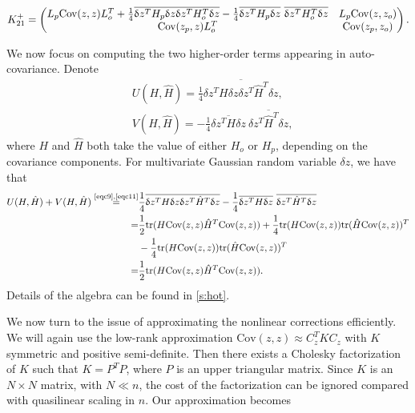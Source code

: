 \documentclass[article,ij4uq]{ij4uq}              %
\begin{document}
\begin{align}
    K_{21}^{+}=\begin{pmatrix}L_{p}{\rm{Cov}}(z,z)L_{o}^{T}+\frac{1}{4}\overline{\delta z^{T}H_{p}\delta z\delta z^{T}H_{o}^{T}\delta z}-\frac{1}{4}\overline{\delta z^{T}H_{p}\delta z}\ \overline{\delta z^{T}H_{o}^{T}\delta z} & L_{p}{\rm{Cov}}(z,z_{o})\\{\rm{Cov}}(z_{p},z)L_{o}^{T} & {\rm{Cov}}(z_{p},z_{o})\end{pmatrix}. \label{eq:jntnlnk21}
\end{align}
\par We now focus on computing the two higher-order terms appearing in auto-covariance. Denote
\begin{align}
    &U(H,\hat{H})=\frac{1}{4}\overline{\delta z^{T}H\delta z\delta z^{T}\hat{H}^{T}\delta z},\label{eq29}\\
    &V(H,\hat{H})=-\frac{1}{4}\overline{\delta z^{T}H\delta z}\ \overline{\delta z^{T}\hat{H}^{T}\delta z},\label{eq30}
\end{align}
where $H$ and $\hat{H}$ both take the value of either $H_{o}$ or $H_{p}$, depending on the covariance components. For multivariate Gaussian random variable $\delta z$, we have that 
\begin{align}
    U(H,\hat{H})+V(H,\hat{H}) \stackrel{\mbox{\tiny \eqref{eqc9},\eqref{eqc11}}}{=}&\frac{1}{4}\overline{\delta z^{T}H\delta z\delta z^{T}\hat{H}^{T}\delta z}-\frac{1}{4}\overline{\delta z^{T}H\delta z}\ \overline{\delta z^{T}\hat{H}^{T}\delta z}\notag\\
    =&\frac{1}{2}\mathrm{tr}(H\mathrm{Cov}(z,z)\hat{H}^{T}\mathrm{Cov}(z,z))+\frac{1}{4}\mathrm{tr}(H\mathrm{Cov}(z,z))\mathrm{tr}(\hat{H}\mathrm{Cov}(z,z))^{T}\notag\\
    &-\frac{1}{4}\mathrm{tr}(H\mathrm{Cov}(z,z))\mathrm{tr}(\hat{H}\mathrm{Cov}(z,z))^{T}\notag\\
    =&\frac{1}{2}\mathrm{tr}(H\mathrm{Cov}(z,z)\hat{H}^{T}\mathrm{Cov}(z,z)).\label{eq31}
\end{align}
Details of the algebra can be found in \ref{s:hot}. 
\par We now turn to the issue of approximating the nonlinear corrections efficiently. We will again use the low-rank approximation $\mathrm{Cov}(z,z)\approx C_{z}^{T}KC_{z}$ with  $K$ symmetric and positive semi-definite. Then there exists a Cholesky factorization of $K$ such that $K=P^{T}P$, where $P$ is an upper triangular matrix. Since $K$ is an $N\times N$ matrix, with $N \ll n$, the cost of the factorization can be ignored compared with quasilinear scaling in $n$. Our approximation becomes
\end{document}
